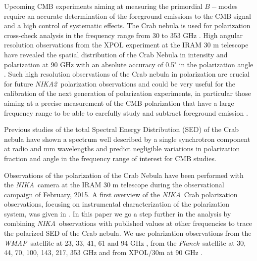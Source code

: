 \documentclass[twocolumn,traditabstract]{aa}
\def\NIKA{\textit{NIKA}}
\def\NIKAd{\textit{NIKA2}}
\def\Planck{\textit{Planck}}
\def\WMAP{\textit{WMAP}}
\begin{document}
Upcoming CMB experiments aiming at measuring the primordial $B-$modes require an accurate
determination of the foreground emissions to the CMB signal and a high control
of systematic effects.
The Crab nebula is used for polarization cross-check analysis in the frequency
range from 30 to 353 GHz \citep{2011ApJS..192...19W,2015arXiv150702058P}. High
angular resolution observations from the XPOL experiment \citep{thum2008} at the
IRAM 30 m telescope have revealed the spatial distribution of the Crab Nebula in
intensity and polarization at 90 GHz with an absolute accuracy of 0.5$^{\circ}$
in the polarization angle \citep{aumont2010}. Such high resolution observations
of the Crab nebula in polarization are crucial for future \NIKAd\ polarization
observations and could be very useful for the calibration of the next generation
of polarization experiments, in particular those aiming at a precise measurement
of the CMB polarization that have a large frequency range to be able to
carefully study and subtract foreground emission \citep{2016IJMPD..2540008K}.

Previous studies \citep{macias2010} of the total Spectral Energy Distribution
(SED) of the Crab nebula have shown a spectrum well described by a single
synchrotron component at radio and mm wavelengths and predict negligible
variations in polarization fraction and angle in the frequency range of interest
for CMB studies.
 
Observations of the polarization of the Crab Nebula have been performed with the
\NIKA\ camera \citep{monfardini2010,catalano2014,monfardini2014} at the IRAM 30
m telescope during the observational campaign of February, 2015. A first
overview of the \NIKA\ Crab polarization observations, focusing on instrumental characterization of the polarization system, was given in
\cite{2016JLTP..184..724R}. In this paper we go a step further in the analysis
by combining \NIKA\ observations with published values at other frequencies to trace the
polarized SED of the Crab nebula. We use polarization observations from the \WMAP\
satellite at 23, 33, 41, 61 and 94 GHz \citep{2011ApJS..192...19W}, from the
\Planck\ satellite at 30, 44, 70, 100, 143, 217, 353 GHz and from XPOL/30m at 90 GHz
\citep{aumont2010}. 
\end{document}
